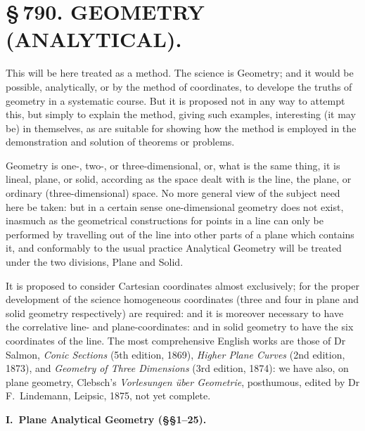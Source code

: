 \documentclass[11pt,a4paper]{article}
\begin{document}
\newpage
\section*{\S\,790. GEOMETRY (ANALYTICAL).}


\smallskip

This will be here treated as a method. The science is Geometry; and it would be possible, analytically, or by the method of coordinates, to develope the truths of geometry in a systematic course. But it is proposed not in any way to attempt this, but simply to explain the method, giving such examples, interesting (it may be) in themselves, as are suitable for showing how the method is employed in the demonstration and solution of theorems or problems.

Geometry is one-, two-, or three-dimensional, or, what is the same thing, it is lineal, plane, or solid, according as the space dealt with is the line, the plane, or ordinary (three-dimensional) space. No more general view of the subject need here be taken: but in a certain sense one-dimensional geometry does not exist, inasmuch as the geometrical constructions for points in a line can only be performed by travelling out of the line into other parts of a plane which contains it, and conformably to the usual practice Analytical Geometry will be treated under the two divisions, Plane and Solid.

It is proposed to consider Cartesian coordinates almost exclusively; for the proper development of the science homogeneous coordinates (three and four in plane and solid geometry respectively) are required: and it is moreover necessary to have the correlative line- and plane-coordinates: and in solid geometry to have the six coordinates of the line. The most comprehensive English works are those of Dr Salmon, \textit{Conic Sections} (5th edition, 1869), \textit{Higher Plane Curves} (2nd edition, 1873), and \textit{Geometry of Three Dimensions} (3rd edition, 1874): we have also, on plane geometry, Clebsch's \textit{Vorlesungen \"{u}ber Geometrie}, posthumous, edited by Dr F.\ Lindemann, Leipsic, 1875, not yet complete.

\smallskip
\begin{center}\textbf{I.\ Plane Analytical Geometry (\S\S 1--25).}\end{center}
\end{document}
